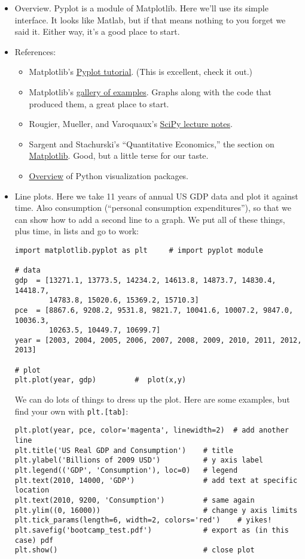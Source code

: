 \documentclass[11pt]{article}
\begin{document}
\begin{itemize}
\item Overview.  Pyplot is a module of Matplotlib.
Here we'll use its simple interface.
It looks like Matlab, but if that means nothing to you forget we said it.
Either way, it's a good place to start.

\item References:
\begin{itemize}
\item Matplotlib's
\href{http://matplotlib.org/users/pyplot_tutorial.html}{Pyplot tutorial}.
(This is excellent, check it out.)
\item Matplotlib's
\href{http://matplotlib.org/gallery.html}{gallery of examples}.
Graphs along with the code that produced them, a great place to start.

\item  Rougier, Mueller, and Varoquaux's
\href{https://scipy-lectures.github.io/intro/matplotlib/matplotlib.html}{SciPy lecture notes}.
\item Sargent and Stachurski's ``Quantitative Economics,''
the section on
\href{http://quant-econ.net/py/matplotlib.html}{Matplotlib}.
Good, but a little terse for our taste.
\item \href{http://pbpython.com/visualization-tools-1.html}{Overview} of Python visualization packages.
\end{itemize}

\item Line plots.
Here we take 11 years of annual US GDP data and plot it against time.
Also consumption (``personal consumption expenditures''), so that we can
show how to add a second line to a graph.
We put all of these things, plus time, in lists and go to work:
\begin{verbatim}
import matplotlib.pyplot as plt     # import pyplot module

# data
gdp  = [13271.1, 13773.5, 14234.2, 14613.8, 14873.7, 14830.4, 14418.7,
        14783.8, 15020.6, 15369.2, 15710.3]
pce  = [8867.6, 9208.2, 9531.8, 9821.7, 10041.6, 10007.2, 9847.0, 10036.3,
        10263.5, 10449.7, 10699.7]
year = [2003, 2004, 2005, 2006, 2007, 2008, 2009, 2010, 2011, 2012, 2013]

# plot
plt.plot(year, gdp)         #  plot(x,y)
\end{verbatim}
We can do lots of things to dress up the plot.
Here are some examples, but find your own with {\tt plt.[tab]}:
\begin{verbatim}
plt.plot(year, pce, color='magenta', linewidth=2)  # add another line
plt.title('US Real GDP and Consumption')    # title
plt.ylabel('Billions of 2009 USD')          # y axis label
plt.legend(('GDP', 'Consumption'), loc=0)   # legend
plt.text(2010, 14000, 'GDP')                # add text at specific location
plt.text(2010, 9200, 'Consumption')         # same again
plt.ylim((0, 16000))                        # change y axis limits
plt.tick_params(length=6, width=2, colors='red')    # yikes!
plt.savefig('bootcamp_test.pdf')            # export as (in this case) pdf
plt.show()                                  # close plot
\end{verbatim}


\end{itemize}
\end{document}
